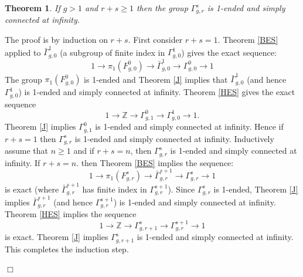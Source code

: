 \documentclass[12pt]{article}
\newtheorem{theorem}{Theorem}[subsection]
\newenvironment{proof}{\addvspace{12pt}\noindent{\bf Proof:}}{
$\Box$\par\addvspace{12pt}}
\begin{document}
\begin{theorem} \label{punbd} 
If $g>1$ and $r+s\geq 1$ then the group $\Gamma_{g,r}^s$ is 1-ended and simply connected at infinity. 
\end{theorem} 
\begin{proof}
The proof is by induction on $r+s$. First consider $r+s=1$.
Theorem \ref{BES} applied to $\bar \Gamma_{g,0}^1$ (a subgroup of finite index in $\Gamma_{g,0}^1$) gives the exact sequence:
$$1\to \pi_1(F_{g,0}^0)\to  \bar \Gamma_{g,0}^1\to \Gamma _{g,0}^0\to 1$$
The group $\pi_1(F_{g,0}^0)$ is 1-ended and
Theorem \ref{J} implies that $\bar \Gamma_{g,0}^1$ (and hence $ \Gamma_{g,0}^1$) 
is 1-ended and simply connected at infinity. Theorem \ref{HES} gives the exact sequence
$$1\to \mathbb Z\to \Gamma_{g,1}^0\to \Gamma_{g,0}^1\to 1.$$
Theorem \ref{J} implies $\Gamma_{g,1}^0$ is 1-ended and simply connected at infinity. Hence if $r+s=1$ then $\Gamma_{g,r}^s$ is 1-ended and simply connected at infinity. Inductively assume that $n\geq 1$ and if $r+s=n$, then $\Gamma_{g,r}^s$ is 1-ended and simply connected at infinity. If $r+s=n$. then Theorem \ref{BES} implies the sequence:
$$1\to \pi_1(F_{g,r}^{s})\to \bar \Gamma_{g,r}^{s+1}\to \Gamma _{g,r}^s\to 1$$
is exact (where $\bar \Gamma_{g,r}^{s+1}$ has finite index in $\Gamma_{g,r}^{s+1}$). Since $\Gamma_{g,r}^s$ is 1-ended, Theorem \ref{J} implies $\bar \Gamma_{g,r}^{s+1}$ (and hence $\Gamma_{g,r}^{s+1}$) is 1-ended and simply connected at infinity. Theorem \ref{HES}
implies the sequence 
$$1\to \mathbb Z\to \Gamma_{g, r+1}^s\to \Gamma_{g,r}^{s+1}\to 1$$ 
is exact. Theorem \ref{J} implies $\Gamma_{g, r+1}^s$ is 1-ended and simply connected at infinity. This completes the induction step.
\end{proof}
\end{document}
